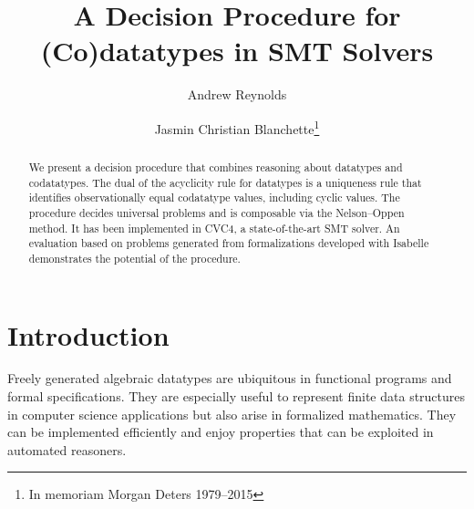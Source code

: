 \documentclass[smallcondensed,draft]{svjour3}
\newcommand\const[1]{\textsf{#1}}
\newcommand\ty[1]{\textit{#1}}
\begin{document}
\title{A Decision Procedure for (Co)datatypes in SMT Solvers}

\author {Andrew Reynolds \and Jasmin Christian Blanchette\thanks{In memoriam Morgan Deters 1979--2015}}


\maketitle

\begin{abstract}
We present a decision procedure that combines reasoning about
datatypes and codatatypes. The dual of the acyclicity rule for datatypes is a
uniqueness rule that identifies observationally equal codatatype values,
including cyclic values. The procedure decides universal
problems and is composable via the Nelson--Oppen method. It has been
implemented in CVC4, a state-of-the-art SMT solver. An evaluation based on
problems generated from formalizations developed with Isabelle demonstrates the
potential of the procedure.
\end{abstract}

\setcounter{footnote}{0}

\section{Introduction}
\label{sec:introduction}

Freely generated algebraic datatypes are ubiquitous in functional programs and
formal specifications. They are especially
useful to represent finite data structures in computer science applications but
also arise in formalized mathematics.
They can be implemented efficiently and enjoy
properties that can be exploited in automated reasoners.
%
\end{document}
